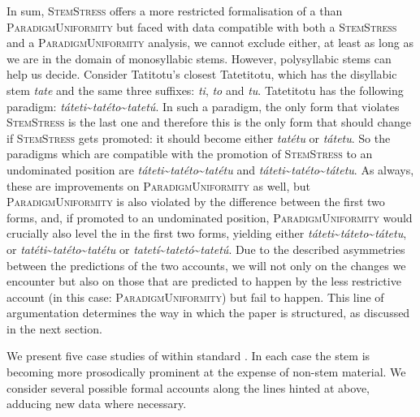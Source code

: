 \documentclass[output=paper,nonflat,colorlinks,citecolor=brown,newtxmath]{langsci/langscibook}
\begin{document}
In sum, \textsc{StemStress} offers a more restricted formalisation of a  than \textsc{ParadigmUniformity} but faced with data compatible with both a \textsc{StemStress} and a \textsc{ParadigmUniformity} analysis, we cannot exclude either, at least as long as we are in the domain of monosyllabic stems. However, polysyllabic stems can help us decide. Consider Tatitotu's closest  Tatetitotu, which has the disyllabic stem \textit{tate} and the same three suffixes: \textit{ti}, \textit{to} and \textit{tu}. Tatetitotu has the following paradigm:  \textit{táteti}\textasciitilde{}\textit{tatéto}\textasciitilde{}\textit{tatetú}. In such a paradigm, the only form that violates \textsc{StemStress}  is the last one and therefore this is the only form that should change if \textsc{StemStress} gets promoted: it should become either \textit{tatétu} or \textit{tátetu}. So the paradigms which are compatible with the promotion of \textsc{StemStress} to an undominated position are \textit{táteti}\textasciitilde{}\textit{tatéto}\textasciitilde{}\textit{tatétu} and \textit{táteti}\textasciitilde{}\textit{tatéto}\textasciitilde{}\textit{tátetu}. As always, these are improvements on \textsc{ParadigmUni\-formity} as well, but \textsc{ParadigmUniformity} is also violated by the difference between the first two forms, and, if promoted to an undominated position, \textsc{ParadigmUniformity} would crucially also level the  in the first two forms, yielding either \textit{táteti}\textasciitilde{}\textit{táteto}\textasciitilde{}\textit{tátetu}, or \textit{tatéti}\textasciitilde{}\textit{tatéto}\textasciitilde{}\textit{tatétu} or \textit{tatetí}\textasciitilde{}\textit{tatetó}\textasciitilde{}\textit{tatetú}. Due to the described asymmetries between the predictions of the two accounts, we will not only  on the changes we encounter but also on those that are predicted to happen by the less restrictive account (in this case: \textsc{ParadigmUniformity}) but fail to happen. This line of argumentation determines the way in which the paper is structured, as discussed in the next section.

We present five case studies of  within standard . In each case the stem is becoming more prosodically prominent at the expense of non-stem material. We consider several possible formal accounts along the lines hinted at above, adducing new data where necessary.
\end{document}
